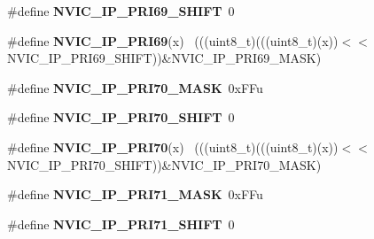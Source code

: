 \begin{DoxyCompactItemize}
\item 
\hypertarget{group___n_v_i_c___register___masks_ga922c8ef8aecda2db297ecb2a86de506d}{}\#define {\bfseries N\+V\+I\+C\+\_\+\+I\+P\+\_\+\+P\+R\+I69\+\_\+\+S\+H\+I\+F\+T}~0\label{group___n_v_i_c___register___masks_ga922c8ef8aecda2db297ecb2a86de506d}

\item 
\hypertarget{group___n_v_i_c___register___masks_gadb4a0b661297af09fa2065b721497d43}{}\#define {\bfseries N\+V\+I\+C\+\_\+\+I\+P\+\_\+\+P\+R\+I69}(x)                                              ~(((uint8\+\_\+t)(((uint8\+\_\+t)(x))$<$$<$N\+V\+I\+C\+\_\+\+I\+P\+\_\+\+P\+R\+I69\+\_\+\+S\+H\+I\+F\+T))\&N\+V\+I\+C\+\_\+\+I\+P\+\_\+\+P\+R\+I69\+\_\+\+M\+A\+S\+K)\label{group___n_v_i_c___register___masks_gadb4a0b661297af09fa2065b721497d43}

\item 
\hypertarget{group___n_v_i_c___register___masks_ga9db959bd8ccb0bc4c551bdadbeaf0d7b}{}\#define {\bfseries N\+V\+I\+C\+\_\+\+I\+P\+\_\+\+P\+R\+I70\+\_\+\+M\+A\+S\+K}~0x\+F\+Fu\label{group___n_v_i_c___register___masks_ga9db959bd8ccb0bc4c551bdadbeaf0d7b}

\item 
\hypertarget{group___n_v_i_c___register___masks_gae423f60c1245aa4e0b2d163ab91e8b50}{}\#define {\bfseries N\+V\+I\+C\+\_\+\+I\+P\+\_\+\+P\+R\+I70\+\_\+\+S\+H\+I\+F\+T}~0\label{group___n_v_i_c___register___masks_gae423f60c1245aa4e0b2d163ab91e8b50}

\item 
\hypertarget{group___n_v_i_c___register___masks_ga9433bb4b8da9bed98265cd3333a427ff}{}\#define {\bfseries N\+V\+I\+C\+\_\+\+I\+P\+\_\+\+P\+R\+I70}(x)                                              ~(((uint8\+\_\+t)(((uint8\+\_\+t)(x))$<$$<$N\+V\+I\+C\+\_\+\+I\+P\+\_\+\+P\+R\+I70\+\_\+\+S\+H\+I\+F\+T))\&N\+V\+I\+C\+\_\+\+I\+P\+\_\+\+P\+R\+I70\+\_\+\+M\+A\+S\+K)\label{group___n_v_i_c___register___masks_ga9433bb4b8da9bed98265cd3333a427ff}

\item 
\hypertarget{group___n_v_i_c___register___masks_ga6355f249aba6934c123023fd185eb873}{}\#define {\bfseries N\+V\+I\+C\+\_\+\+I\+P\+\_\+\+P\+R\+I71\+\_\+\+M\+A\+S\+K}~0x\+F\+Fu\label{group___n_v_i_c___register___masks_ga6355f249aba6934c123023fd185eb873}

\item 
\hypertarget{group___n_v_i_c___register___masks_gaea0cd4f1e6a9aa32ce49435e99d6c3a9}{}\#define {\bfseries N\+V\+I\+C\+\_\+\+I\+P\+\_\+\+P\+R\+I71\+\_\+\+S\+H\+I\+F\+T}~0\label{group___n_v_i_c___register___masks_gaea0cd4f1e6a9aa32ce49435e99d6c3a9}


\end{DoxyCompactItemize}
